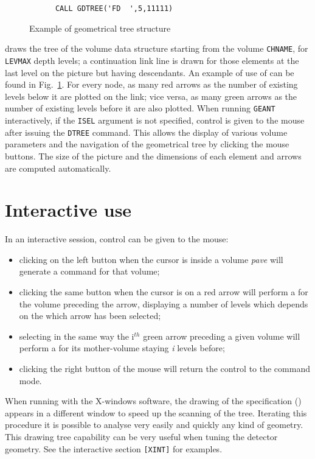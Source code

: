 \begin{figure}[hbt]
     \centering
\begin{verbatim}
      CALL GDTREE('FD  ',5,11111)
\end{verbatim}
     \caption{Example of geometrical tree structure}
     \label{fg:draw210-1}
\end{figure}
 draws the tree of the volume data structure starting
from the volume {\tt CHNAME}, for {\tt LEVMAX} depth levels;
a continuation link line is drawn for those elements
at the last level on the picture but having descendants.
An example of use of  can be found in Fig.~\ref{fg:draw210-1}.
For every node, as many red arrows as the number of existing levels below it
are plotted on the link; vice versa, as many green arrows as the number of 
existing levels before it are also plotted.
When running {\tt GEANT} interactively, if the {\tt ISEL}
argument is not specified, control is given to the
mouse after issuing the {\tt DTREE} command. This allows the display of various
volume parameters and the navigation of the geometrical tree by
clicking the mouse buttons.
The size of the picture and the dimensions of each
element and arrows are computed automatically. 

\section*{Interactive use}
In an interactive session, control can be given to the mouse: 
\begin{itemize}
\item clicking on the left button when the cursor is inside a volume
{\it pave} will generate a  command for that volume; 
\item clicking the same button when the cursor is on a red arrow will 
perform a  for the volume preceding the arrow, displaying a
number of levels which depends on the which arrow has been selected;
\item selecting in the same way the i$^{th}$ green arrow preceding 
a given volume will perform a 
for its mother-volume staying {\it i} levels before;
\item clicking the right button of the mouse will return
the control to the command mode.
\end{itemize}
 
When running with the X-windows software, the drawing of the 
specification () appears in a different window to 
speed up the scanning of the tree. Iterating this procedure it is 
possible to analyse very easily and quickly any kind of geometry. 
This drawing tree capability can be very
useful when tuning the detector geometry.
See the interactive section {\tt [XINT]} for examples.
